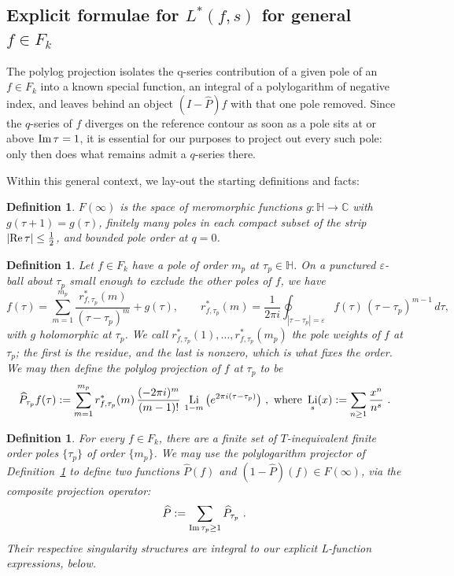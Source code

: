 \documentclass[11pt]{article}
\newtheorem{definition}[theorem]{Definition}
\newcommand{\HH}{\mathbb{H}}
\newcommand{\CC}{\mathbb{C}}
\DeclareMathOperator{\Li}{Li}
\begin{document}
\subsection{Explicit formulae for $L^*(f,s)$ for general $f \in F_k$}

The polylog projection isolates the q-series contribution of a given pole of an $f \in F_k$
into a known special function, an integral of a polylogarithm of negative index, and leaves 
behind an object $(I-\widehat P)f$ with that one pole removed. Since the $q$-series of $f$ diverges
on the reference contour as soon as a pole sits at or above ${\rm Im}\,\tau=1$, it is essential for
our purposes to project out every such pole: only then does what remains admit a $q$-series there.

Within this general context, we lay-out the starting definitions and facts:

\begin{definition}\label{def:Finfty}
$F(\infty)$ is the space of meromorphic functions $g:\HH\to\CC$ with $g(\tau+1)=g(\tau)$, finitely many
poles in each compact subset of the strip $|{\rm Re}\,\tau|\le\tfrac12$, and bounded pole order at $q = 0$. 
\end{definition}

\begin{definition}\label{def:proj}
Let $f\in F_k$ have a pole of order $m_p$ at $\tau_p\in\HH$. On a punctured $\varepsilon$-ball about
$\tau_p$ small enough to exclude the other poles of $f$, we have
\begin{equation}\label{eq:laurent}
f(\tau)=\sum_{m=1}^{m_p}\frac{r^*_{f,\tau_p}(m)}{(\tau-\tau_p)^{m}}+g(\tau),
\qquad
r^*_{f,\tau_p}(m)=\frac{1}{2\pi i}\oint_{|\tau-\tau_p|=\varepsilon}
f(\tau)\,(\tau-\tau_p)^{m-1}\,d\tau ,
\end{equation}
with $g$ holomorphic at $\tau_p$. We call $r^*_{f,\tau_p}(1),\dots,r^*_{f,\tau_p}(m_p)$ the
\emph{pole weights} of $f$ at $\tau_p$; the first is the residue, and the last is nonzero, which is
what fixes the order. We may then define the \emph{polylog projection} of $f$ at $\tau_p$ to be
\begin{equation}\label{eq:polyproj}
\widehat P_{\tau_p}f(\tau):=\sum_{m=1}^{m_p} r^*_{f,\tau_p}(m)\,
\frac{(-2\pi i)^m}{(m-1)!}\,\Li_{1-m}\big(e^{2\pi i(\tau-\tau_p)}\big)~,~{\rm where} ~\Li_s(x):=\sum_{n\ge1}\frac{x^{n}}{n^{s}}~.
\end{equation}
\end{definition}

\begin{definition}\label{def:pole_split}
For every $f \in F_k$, there are a finite set of $T$-inequivalent finite order poles
$\{ \tau_p \}$ of order $\{ m_p \}$. We may use the polylogarithm projector of
Definition~\ref{def:proj} to define two functions $\widehat{P}(f)$ and
$(1-\widehat{P})(f) \in F(\infty)$, via the composite projection operator:
\begin{equation}\label{eq:polesplit}
\widehat P:=\sum_{{\rm Im}\,\tau_p\ge1}\widehat P_{\tau_p}~.
\end{equation}
Their respective singularity structures are integral to our explicit L-function expressions,
below.
\end{definition}
\end{document}
